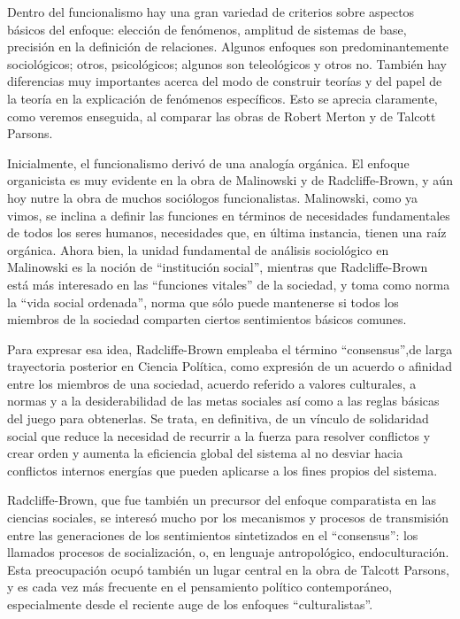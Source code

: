 \documentclass[
]{book}
\begin{document}
Dentro del funcionalismo hay una gran variedad de criterios sobre aspectos básicos del enfoque: elección de fenómenos, amplitud de sistemas de base, precisión en la definición de relaciones. Algunos enfoques son predominantemente sociológicos; otros, psicológicos; algunos son teleológicos y otros no. También hay diferencias muy importantes acerca del modo de construir teorías y del papel de la teoría en la explicación de fenómenos específicos. Esto se aprecia claramente, como veremos enseguida, al comparar las obras de Robert Merton y de Talcott Parsons.

Inicialmente, el funcionalismo derivó de una analogía orgánica. El enfoque organicista es muy evidente en la obra de Malinowski y de Radcliffe-Brown, y aún hoy nutre la obra de muchos sociólogos funcionalistas. Malinowski, como ya vimos, se inclina a definir las funciones en términos de necesidades fundamentales de todos los seres humanos, necesidades que, en última instancia, tienen una raíz orgánica. Ahora bien, la unidad fundamental de análisis sociológico en Malinowski es la noción de ``institución social'', mientras que Radcliffe-Brown está más interesado en las ``funciones vitales'' de la sociedad, y toma como norma la ``vida social ordenada'', norma que sólo puede mantenerse si todos los miembros de la sociedad comparten ciertos sentimientos básicos comunes.

Para expresar esa idea, Radcliffe-Brown empleaba el término ``consensus'',de larga trayectoria posterior en Ciencia Política, como expresión de un acuerdo o afinidad entre los miembros de una sociedad, acuerdo referido a valores culturales, a normas y a la desiderabilidad de las metas sociales así como a las reglas básicas del juego para obtenerlas. Se trata, en definitiva, de un vínculo de solidaridad social que reduce la necesidad de recurrir a la fuerza para resolver conflictos y crear orden y aumenta la eficiencia global del sistema al no desviar hacia conflictos internos energías que pueden aplicarse a los fines propios del sistema.

Radcliffe-Brown, que fue también un precursor del enfoque comparatista en las ciencias sociales, se interesó mucho por los mecanismos y procesos de transmisión entre las generaciones de los sentimientos sintetizados en el ``consensus'': los llamados procesos de socialización, o, en lenguaje antropológico, endoculturación. Esta preocupación ocupó también un lugar central en la obra de Talcott Parsons, y es cada vez más frecuente en el pensamiento político contemporáneo, especialmente desde el reciente auge de los enfoques ``culturalistas''.
\end{document}
